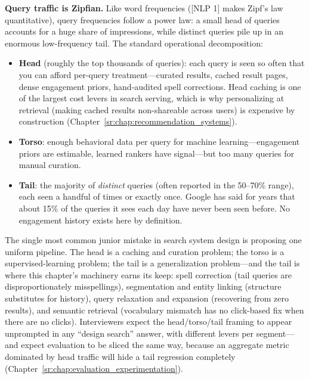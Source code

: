 \textbf{Query traffic is Zipfian.} Like word frequencies ([NLP 1] makes Zipf's law quantitative), query frequencies follow a power law: a small head of queries accounts for a huge share of impressions, while distinct queries pile up in an enormous low-frequency tail. The standard operational decomposition:

\begin{itemize}
    \item \textbf{Head} (roughly the top thousands of queries): each query is seen so often that you can afford per-query treatment---curated results, cached result pages, dense engagement priors, hand-audited spell corrections. Head caching is one of the largest cost levers in search serving, which is why personalizing at retrieval (making cached results non-shareable across users) is expensive by construction (Chapter~\ref{sr:chap:recommendation_systems}).
    \item \textbf{Torso}: enough behavioral data per query for machine learning---engagement priors are estimable, learned rankers have signal---but too many queries for manual curation.
    \item \textbf{Tail}: the majority of \textit{distinct} queries (often reported in the 50--70\% range), each seen a handful of times or exactly once. Google has said for years that about 15\% of the queries it sees each day have never been seen before. No engagement history exists here by definition.
\end{itemize}

\begin{keyinsight}
The single most common junior mistake in search system design is proposing one uniform pipeline. The head is a caching and curation problem; the torso is a supervised-learning problem; the tail is a generalization problem---and the tail is where this chapter's machinery earns its keep: spell correction (tail queries are disproportionately misspellings), segmentation and entity linking (structure substitutes for history), query relaxation and expansion (recovering from zero results), and semantic retrieval (vocabulary mismatch has no click-based fix when there are no clicks). Interviewers expect the head/torso/tail framing to appear unprompted in any ``design search'' answer, with different levers per segment---and expect evaluation to be sliced the same way, because an aggregate metric dominated by head traffic will hide a tail regression completely (Chapter~\ref{sr:chap:evaluation_experimentation}).
\end{keyinsight}

